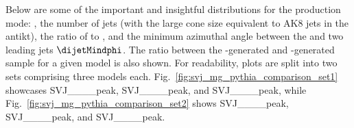 Below are some of the important and insightful distributions for the \schannel production mode: \mT, the number of \glspl{jet} (with the large cone size equivalent to AK8 \glspl{jet} in the \gls{antikt}), the ratio of \ptmiss to \mT, and the minimum azimuthal angle between the \ptmiss and two leading \glspl{jet} $\dijetMindphi$. The ratio between the \MADGRAPH-generated and \PYTHIA-generated sample for a given model is also shown. For readability, plots are split into two sets comprising three models each. Fig.~\ref{fig:svj_mg_pythia_comparison_set1} showcases SVJ\_\_\_\_\-peak, SVJ\_\_\_\_\-peak, and SVJ\_\_\_\_\-peak, while Fig.~\ref{fig:svj_mg_pythia_comparison_set2} shows SVJ\_\_\_\_\-peak, SVJ\_\_\_\_\-peak, and SVJ\_\_\_\_\-peak.

